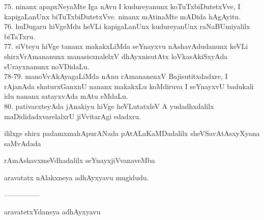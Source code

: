 \documentclass{article}
\begin{document}
75. ninanx apapxNeyaMte Iga nAvu I kudureyanunx koTuTxbiDutetxVve, I kapigaLanUnx biTuTxbiDutetxVve. ninanx mAtinaMte mADida hAgAyitu.\\
76. huDugaru hiVgeMdu heVLi kapigaLanUnx kudureyanUnx raNaBUmiyalilx biTaTxru.\\
77. siVteyu hiVge tananx makakxLiMda seYnayxvu nAshavAdudanunx keVLi shirxVrAmananunx manasisxnalelxV dhAyxnisutAtx loVkasAkiSxyAda sUrayxnanunx noVDidaLu.\\
78-79. manoVvAkAyagaLiMda nAnu rAmananenxV Bajisutitxdadxre, I rAjanAda shaturxGanxnU nananx makakxLu koMdiruva I seYnayxvU badukali idu nananx satayxvAda mAtu eMdaLu.\\
80. pativarxteyAda jAnakiyu hiVge heVLutatxleV A yudadhxdalilx maDididadxvarelalxrU jiVvitarAgi edadxru.\\

\begin{center}
ililxge shirx padamxmahApurANada pAtALaKaMDadalilx sheVSavAtAsxyXyana saMvAdada
\end{center}

\begin{center}
rAmAshavxmeVdhadalilx seYnayxjiVvanaveMba
\end{center}

\begin{center}
aravatatx nAlakxneya adhAyxyavu mugidudu.
\end{center}

\begin{center}
---------------
\end{center}

\begin{center}
aravatetxYdaneya adhAyxyavu
\end{center}
\end{document}
